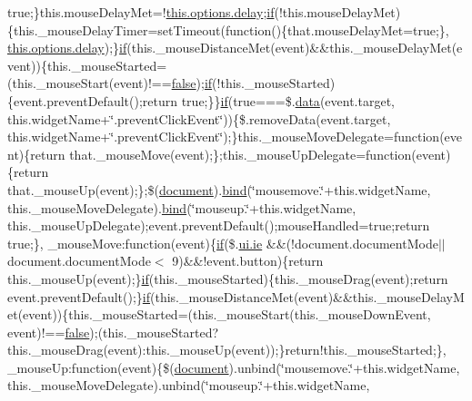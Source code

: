 \begin{DoxyCompactItemize}
true;\}this.\+mouse\+Delay\+Met=!\hyperlink{jquery_8mobile-1_83_81_8js_aa109bb8c15dd398a7b3059507518c06e}{this.\+options.\+delay};\hyperlink{fullpage_2plugin_8js_a8b98017e64ef036adb9ae327ff94abe1}{if}(!this.\+mouse\+Delay\+Met)\{this.\+\_\+mouse\+Delay\+Timer=set\+Timeout(function()\{that.\+mouse\+Delay\+Met=true;\}, \hyperlink{jquery_8mobile-1_83_81_8js_aa109bb8c15dd398a7b3059507518c06e}{this.\+options.\+delay});\}\hyperlink{fullpage_2plugin_8js_a8b98017e64ef036adb9ae327ff94abe1}{if}(this.\+\_\+mouse\+Distance\+Met(event)\&\&this.\+\_\+mouse\+Delay\+Met(event))\{this.\+\_\+mouse\+Started=(this.\+\_\+mouse\+Start(event)!==\hyperlink{validate_8js_a5df37b7f02e5cdc7d9412b7f872b8e01}{false});\hyperlink{fullpage_2plugin_8js_a8b98017e64ef036adb9ae327ff94abe1}{if}(!this.\+\_\+mouse\+Started)\{event.\+prevent\+Default();return true;\}\}\hyperlink{fullpage_2plugin_8js_a8b98017e64ef036adb9ae327ff94abe1}{if}(true===\$.\hyperlink{fullpage_2plugin_8js_a718c1bf5a3bf21ebb980203b142e5b75}{data}(event.\+target, this.\+widget\+Name+\char`\"{}.prevent\+Click\+Event\char`\"{}))\{\$.remove\+Data(event.\+target, this.\+widget\+Name+\char`\"{}.prevent\+Click\+Event\char`\"{});\}this.\+\_\+mouse\+Move\+Delegate=function(event)\{return that.\+\_\+mouse\+Move(event);\};this.\+\_\+mouse\+Up\+Delegate=function(event)\{return that.\+\_\+mouse\+Up(event);\};\$(\hyperlink{outside_events_8js_aa14f8e0338cced6720590fd2ea13bd4b}{document}).\hyperlink{jquery_8mobile-1_83_81_8js_aa28c4555fcf1f84917a1d70644f7174f}{bind}(\char`\"{}mousemove.\char`\"{}+this.\+widget\+Name, this.\+\_\+mouse\+Move\+Delegate).\hyperlink{jquery_8mobile-1_83_81_8js_aa28c4555fcf1f84917a1d70644f7174f}{bind}(\char`\"{}mouseup.\char`\"{}+this.\+widget\+Name, this.\+\_\+mouse\+Up\+Delegate);event.\+prevent\+Default();mouse\+Handled=true;return true;\}, \+\_\+mouse\+Move\+:function(event)\{\hyperlink{fullpage_2plugin_8js_a8b98017e64ef036adb9ae327ff94abe1}{if}(\$.\hyperlink{jquery-ui_8js_a7434fb8cf6da72f87b732a8a052232a3}{ui.\+ie} \&\&(!document.\+document\+Mode$\vert$$\vert$document.\+document\+Mode$<$ 9)\&\&!event.\+button)\{return this.\+\_\+mouse\+Up(event);\}\hyperlink{fullpage_2plugin_8js_a8b98017e64ef036adb9ae327ff94abe1}{if}(this.\+\_\+mouse\+Started)\{this.\+\_\+mouse\+Drag(event);return event.\+prevent\+Default();\}\hyperlink{fullpage_2plugin_8js_a8b98017e64ef036adb9ae327ff94abe1}{if}(this.\+\_\+mouse\+Distance\+Met(event)\&\&this.\+\_\+mouse\+Delay\+Met(event))\{this.\+\_\+mouse\+Started=(this.\+\_\+mouse\+Start(this.\+\_\+mouse\+Down\+Event, event)!==\hyperlink{validate_8js_a5df37b7f02e5cdc7d9412b7f872b8e01}{false});(this.\+\_\+mouse\+Started?this.\+\_\+mouse\+Drag(event)\+:this.\+\_\+mouse\+Up(event));\}return!this.\+\_\+mouse\+Started;\}, \+\_\+mouse\+Up\+:function(event)\{\$(\hyperlink{outside_events_8js_aa14f8e0338cced6720590fd2ea13bd4b}{document}).unbind(\char`\"{}mousemove.\char`\"{}+this.\+widget\+Name, this.\+\_\+mouse\+Move\+Delegate).unbind(\char`\"{}mouseup.\char`\"{}+this.\+widget\+Name, 
\end{DoxyCompactItemize}
